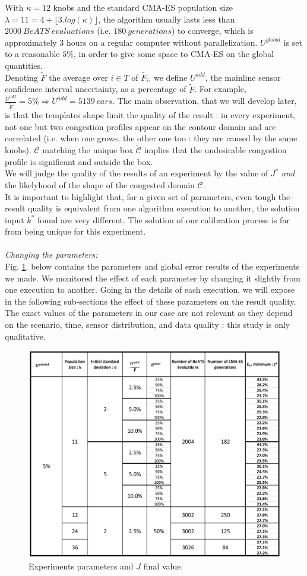 With $\kappa=12$ knobs and the standard CMA-ES population size $\lambda=11=4+\lfloor3.log(\kappa)\rfloor$, the algorithm usually lasts less than $2000\ BeATS\ evaluations$ (i.e. $180\ generations$) to converge, which is  approximately 3 hours on a regular computer without parallelization.
$U^{global}$ is set to a reasonable $5\%$, in order to give some space to CMA-ES on the global quantities.\\
Denoting $\widetilde{F}$ the average over $i\in T$ of $\widetilde{F_{i}}$, we define $U^{add}$, the mainline sensor confidence interval uncertainty, as a percentage of $\widetilde{F}$. For example, $\frac{U^{add}}{\widetilde{F}}=5\% \Rightarrow U^{add}=5139\ cars$.
The main observation, that we will develop later, is that the templates shape limit the quality of the result : in every experiment, not one but two congestion profiles appear on the contour domain and are correlated (i.e. when one grows, the other one too : they are caused by the same knobs).  $\mathscr{C}$ matching the unique box $\widetilde{\mathscr{C}}$ implies that the undesirable congestion profile is significant and outside the box.\\
We will judge the quality of the results of an experiment by the value of $J^{*}$ \emph{and} the likelyhood of the shape of the congested domain $\mathscr{C}$. \\
It is important to highlight that, for a given set of parameters, even tough the result quality is equivalent from one algorithm execution to another, the solution input $k^{*}$ found are very different. The solution of our calibration process is far from being unique for this experiment.\\
\\
\emph{Changing the parameters:}\\
Fig. \ref{fig:results_array}. below contains the parameters and global error results of the experiments we made. We monitored the effect of each parameter by changing it slightly from one execution to another. Going in the details of each execution, we will expose in the following sub-sections the effect of these parameters on the result quality. The exact values of the parameters in our case are not relevant as they depend on the scenario, time, sensor distribution, and data quality : this study is only qualitative.
\begin{figure}
\centering
	\caption{Experiments parameters and $J$ final value.}
	\label{fig:results_array}
	\includegraphics[width=7in]{figures/results_array.png}
\end{figure}
\newpage


